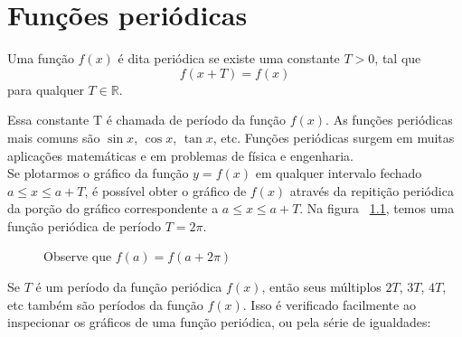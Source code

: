 
\chapter{Funções periódicas}

\begin{definicao}
\label{def1}
    
Uma função $f(x)$ é dita periódica se existe uma constante $T > 0$, tal que 
\begin{equation}
    f(x + T) = f(x)
\end{equation}
para qualquer $T \in \mathbb{R}$. 
\end{definicao}
Essa constante T é chamada de período da função $f(x)$. As funções periódicas 
mais comuns são $\sin{x}$, $\cos{x}$, $\tan{x}$, etc. Funções periódicas surgem
em muitas aplicações matemáticas e em problemas de física e engenharia.\\

Se plotarmos o gráfico da função $y=f(x)$ em qualquer intervalo fechado 
\mbox{$a \leq x \leq a + T$}, é possível obter o gráfico de $f(x)$ através da 
repitição periódica da porção do gráfico correspondente a \mbox{$a \leq x \leq a + T$}.
Na figura ~\ref{fig:periodExp}, temos uma função periódica de período $T=2\pi$.
\\
\begin{figure}[H]
    \caption{Observe que $f(a) = f(a + 2\pi)$}
    \label{fig:periodExp}
\end{figure}

Se $T$ é um período da função periódica $f(x)$, então seus múltiplos $2T$, $3T$, $4T$, etc 
também são períodos da função $f(x)$. Isso é verificado facilmente ao inspecionar 
os gráficos de uma função periódica, ou pela série de igualdades:\\

